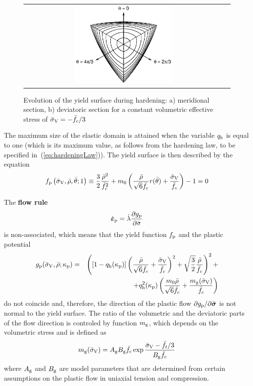 \documentclass[a4paper]{article}
\newcommand{\mbf}[1]{\mbox{\boldmath$#1$}}
\newcommand{\bea}{\begin{eqnarray}}
\newcommand{\eea}{\end{eqnarray}}
\newcommand{\eps} {\mbf{\varepsilon}}
\newcommand{\vsig}{\mbf{\sigma}}%
\begin{document}
\begin{figure}[!htb]
\begin{tabular}{cc}
\else
\includegraphics[width=0.5\textwidth]{deviatoric.eps}
\fi
\end{tabular} 
\caption{Evolution of the yield surface during hardening:
a) meridional section, b) deviatoric section for a constant volumetric effective stress of $\bar{\sigma}_{\rm V} = -\bar{f}_c/3$} 
\label{fig:surfaceMerDev}
\end{figure}

The maximum size of the elastic domain is attained when the variable $q_{\rm h}$ is equal to one (which is its maximum value, as follows from the hardening law, to be specified in~(\ref{eq:hardeningLaw})). The yield surface is then described by the equation
%
\begin{equation}\label{eq:failureSurface}
f_{\rm p}\left(\bar\sigma_{\rm V},\bar\rho,\bar\theta;1\right) \equiv \frac{3}{2} \frac{\bar{\rho}^2}{\bar{f}_c^2} + m_0 \left(\frac{\bar{\rho} }{\sqrt{6}\bar{f}_c}r(\bar{\theta}) + \frac{\bar{\sigma}_{\rm V}}{\bar{f}_c} \right) - 1 = 0
\end{equation}

The {\bf flow rule} 
%
\begin{equation} \label{eq:flowRuleDPM}
\dot{\mbf{\eps}}_{\rm p} = \dot{\lambda} \frac{\partial g_{\rm p}}{\partial\bar{\sigma}} 
\end{equation}
%
is non-associated, which means that the yield function $f_{\rm p}$ and the plastic potential 
\bea\nonumber
g_{\rm p}(\bar\sigma_{\rm V},\bar\rho;\kappa_{\rm p})&=&\left(\left[1-q_{\rm{h}}(\kappa_{\rm p})\right] \left( \frac{\bar{\rho}} {\sqrt{6}\fc} + \frac{\bar{\sigma}_{\rm V}}{\fc} \right)^2 + \sqrt{\frac{3}{2}} \frac {\bar{\rho}}{\fc} \right)^2 +\\
&&+q_{\rm{h}}^2(\kappa_{\rm p}) \left( \frac{m_0 \bar{\rho}}{\sqrt{6}\fc} + \frac{m_{\rm g}(\bar{\sigma}_{\rm V})}{\fc} \right)
 \label{eq:plasticPotential}
\eea
do not coincide and, therefore, the direction of the plastic flow $\partial g_{\rm p}/\partial\bar{\vsig}$ is not normal to the yield surface.
The ratio of the volumetric and the deviatoric parts of the flow direction is controled by function $m_{\rm g}$, which depends on the volumetric stress and is defined as 
\begin{equation} \label{eq:mg}
m_{\rm g}(\bar{\sigma}_{\rm V})=A_{\rm g}B_{\rm g}\bar{f}_c \exp{\frac{\bar{\sigma}_{\rm V} -\bar{f}_t/3}{B_{\rm g}\bar{f}_c}}
\end{equation}
%
where $A_{\rm g}$ and $B_{\rm g}$ are model parameters that are determined from certain assumptions on the plastic flow in uniaxial tension and compression.
\end{document}
